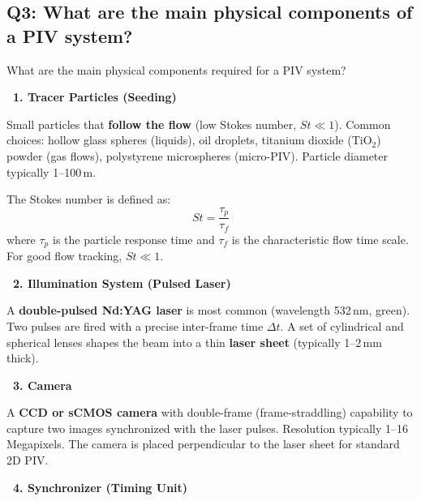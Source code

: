 \documentclass[12pt,a4paper]{article}
\begin{document}
\subsection{Q3: What are the main physical components of a PIV system?}

\begin{questionbox}
What are the main physical components required for a PIV system?
\end{questionbox}

\begin{answerbox}

\textbf{\color{deepblue}~1. Tracer Particles (Seeding)}

Small particles that \textbf{follow the flow} (low Stokes number, $St \ll 1$). Common choices: hollow glass spheres (liquids), oil droplets, titanium dioxide ($\mathrm{TiO_2}$) powder (gas flows), polystyrene microspheres (micro-PIV). Particle diameter typically 1--100\,\textmu m.

\begin{mathbox}
The Stokes number is defined as:
\begin{equation}
    St = \frac{\tau_p}{\tau_f}
\end{equation}
where $\tau_p$ is the particle response time and $\tau_f$ is the characteristic flow time scale. For good flow tracking, $St \ll 1$.
\end{mathbox}

\vspace{0.5em}
\textbf{\color{deepblue}~2. Illumination System (Pulsed Laser)}

A \textbf{double-pulsed Nd:YAG laser} is most common (wavelength 532\,nm, green). Two pulses are fired with a precise inter-frame time $\Delta t$. A set of cylindrical and spherical lenses shapes the beam into a thin \textbf{laser sheet} (typically 1--2\,mm thick).

\vspace{0.5em}
\textbf{\color{deepblue}~3. Camera}

A \textbf{CCD or sCMOS camera} with double-frame (frame-straddling) capability to capture two images synchronized with the laser pulses. Resolution typically 1--16 Megapixels. The camera is placed perpendicular to the laser sheet for standard 2D PIV.

\vspace{0.5em}
\textbf{\color{deepblue}~4. Synchronizer (Timing Unit)}


\end{answerbox}
\end{document}
